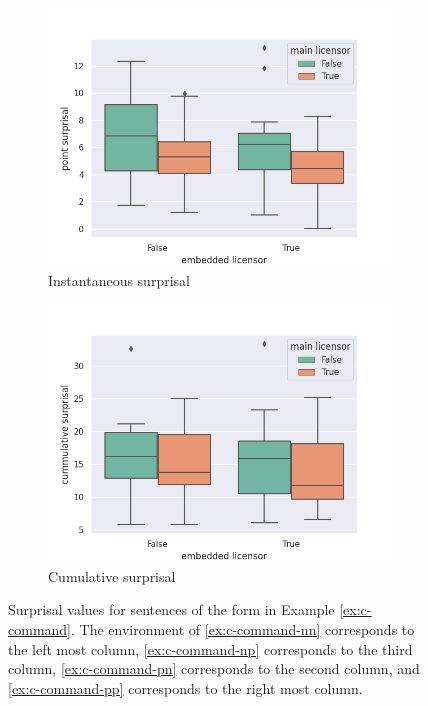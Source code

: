 \documentclass[11pt, round]{article}
\begin{document}
\begin{figure}
    \centering
    \begin{subfigure}[b]{0.5\textwidth}
        \centering
        \includegraphics[width=\textwidth]{point_surprisal_c_command}
        \caption{Instantaneous surprisal}
    \end{subfigure}
    \hfill
    \begin{subfigure}[b]{0.5\textwidth}
        \centering
        \includegraphics[width=\textwidth]{cummulative_surprisal_c_command}
        \caption{Cumulative surprisal}
    \end{subfigure}
    \caption{Surprisal values for sentences of the form in Example \ref{ex:c-command}. The environment of \ref{ex:c-command-nn} corresponds to the left most column, \ref{ex:c-command-np} corresponds to the third column, \ref{ex:c-command-pn} corresponds to the second column, and \ref{ex:c-command-pp} corresponds to the right most column.}
    \label{fig:c-command-box-plots}
\end{figure}
\end{document}
